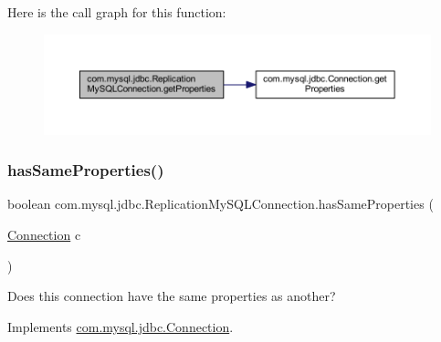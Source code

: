 Here is the call graph for this function\+:
\nopagebreak
\begin{figure}[H]
\begin{center}
\leavevmode
\includegraphics[width=350pt]{classcom_1_1mysql_1_1jdbc_1_1_replication_my_s_q_l_connection_a93f7c5bbec567b742e4f9f94b81f1493_cgraph}
\end{center}
\end{figure}
\mbox{\label{classcom_1_1mysql_1_1jdbc_1_1_replication_my_s_q_l_connection_a6add28fadea7fd82449464de48062955}} 
\subsubsection{\texorpdfstring{has\+Same\+Properties()}{hasSameProperties()}}
{\footnotesize\ttfamily boolean com.\+mysql.\+jdbc.\+Replication\+My\+S\+Q\+L\+Connection.\+has\+Same\+Properties (\begin{DoxyParamCaption}\item[{\mbox{\hyperlink{interfacecom_1_1mysql_1_1jdbc_1_1_connection}{Connection}}}]{c }\end{DoxyParamCaption})}

Does this connection have the same properties as another? 

Implements \mbox{\hyperlink{interfacecom_1_1mysql_1_1jdbc_1_1_connection_aa075b035aedfaf2d59114dde53cfc3de}{com.\+mysql.\+jdbc.\+Connection}}.

